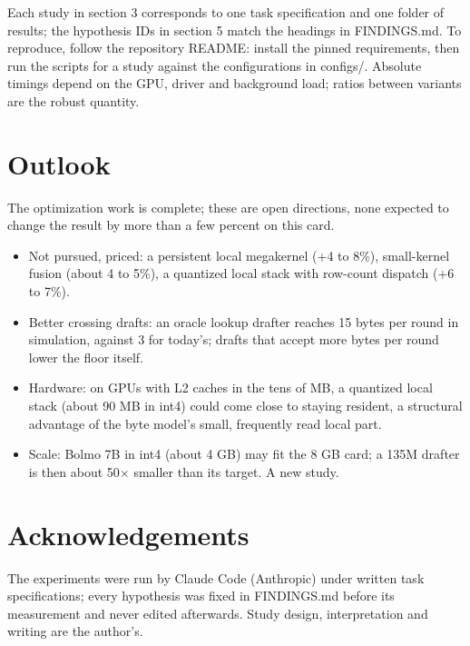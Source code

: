 \documentclass[11pt,a4paper]{article}
\newcommand{\x}{\ensuremath{\times}}
\begin{document}
Each study in section 3 corresponds to one task specification and one folder of results; the hypothesis IDs in section 5 match the headings in FINDINGS.md. To reproduce, follow the repository README: install the pinned requirements, then run the scripts for a study against the configurations in configs/. Absolute timings depend on the GPU, driver and background load; ratios between variants are the robust quantity.

\section{Outlook}\label{outlook}

The optimization work is complete; these are open directions, none expected to change the result by more than a few percent on this card.

\begin{itemize}
\item
  Not pursued, priced: a persistent local megakernel (+4 to 8\%), small-kernel fusion (about 4 to 5\%), a quantized local stack with row-count dispatch (+6 to 7\%).
\item
  Better crossing drafts: an oracle lookup drafter reaches 15 bytes per round in simulation, against 3 for today's; drafts that accept more bytes per round lower the floor itself.
\item
  Hardware: on GPUs with L2 caches in the tens of MB, a quantized local stack (about 90 MB in int4) could come close to staying resident, a structural advantage of the byte model's small, frequently read local part.
\item
  Scale: Bolmo 7B in int4 (about 4 GB) may fit the 8 GB card; a 135M drafter is then about 50\x{} smaller than its target. A new study.
\end{itemize}

\section*{Acknowledgements}
The experiments were run by Claude Code (Anthropic) under written task specifications; every hypothesis was fixed in FINDINGS.md before its measurement and never edited afterwards. Study design, interpretation and writing are the author's.



\end{document}
